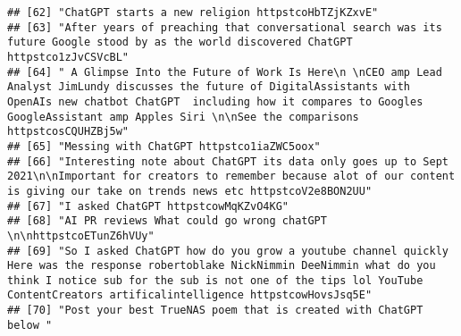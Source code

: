 \documentclass[
]{article}
\begin{document}
\begin{verbatim}
## [62] "ChatGPT starts a new religion httpstcoHbTZjKZxvE"                                                                                                                                                                                                                                                                  
## [63] "After years of preaching that conversational search was its future Google stood by as the world discovered ChatGPT httpstco1zJvCSVcBL"                                                                                                                                                                             
## [64] " A Glimpse Into the Future of Work Is Here\n \nCEO amp Lead Analyst JimLundy discusses the future of DigitalAssistants with OpenAIs new chatbot ChatGPT  including how it compares to Googles GoogleAssistant amp Apples Siri \n\nSee the comparisons httpstcosCQUHZBj5w"                                          
## [65] "Messing with ChatGPT httpstco1iaZWC5oox"                                                                                                                                                                                                                                                                           
## [66] "Interesting note about ChatGPT its data only goes up to Sept 2021\n\nImportant for creators to remember because alot of our content is giving our take on trends news etc httpstcoV2e8BON2UU"                                                                                                                      
## [67] "I asked ChatGPT httpstcowMqKZvO4KG"                                                                                                                                                                                                                                                                                
## [68] "AI PR reviews What could go wrong chatGPT \n\nhttpstcoETunZ6hVUy"                                                                                                                                                                                                                                                  
## [69] "So I asked ChatGPT how do you grow a youtube channel quickly Here was the response robertoblake NickNimmin DeeNimmin what do you think I notice sub for the sub is not one of the tips lol YouTube ContentCreators artificalintelligence httpstcowHovsJsq5E"                                                       
## [70] "Post your best TrueNAS poem that is created with ChatGPT below "                                                                                                                                                                                                                                                   

\end{verbatim}
\end{document}
